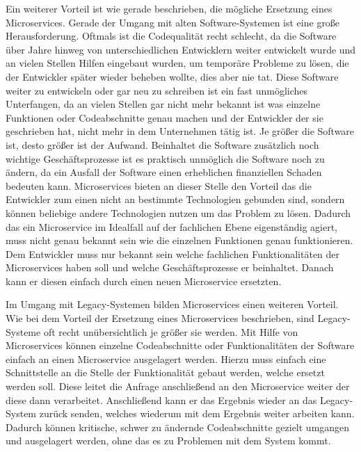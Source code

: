 Ein weiterer Vorteil ist wie gerade beschrieben, die mögliche Ersetzung eines Microservices.
Gerade der Umgang mit alten Software-Systemen ist eine große Herausforderung. Oftmals ist die Codequalität recht schlecht, da die Software über Jahre hinweg von unterschiedlichen Entwicklern weiter entwickelt wurde und an vielen Stellen Hilfen eingebaut wurden, um temporäre Probleme zu lösen, die der Entwickler später wieder beheben wollte, dies aber nie tat. Diese Software weiter zu entwickeln oder gar neu zu schreiben ist ein fast unmögliches Unterfangen, da an vielen Stellen gar nicht mehr bekannt ist was einzelne Funktionen oder Codeabschnitte genau machen und der Entwickler der sie geschrieben hat, nicht mehr in dem Unternehmen tätig ist. Je größer die Software ist, desto größer ist der Aufwand. Beinhaltet die Software zusätzlich noch wichtige Geschäftsprozesse ist es praktisch unmöglich die Software noch zu ändern, da ein Ausfall der Software einen erheblichen finanziellen Schaden bedeuten kann.\newline
Microservices bieten an dieser Stelle den Vorteil das die Entwickler zum einen nicht an bestimmte Technologien gebunden sind, sondern können beliebige andere Technologien nutzen um das Problem zu lösen. Dadurch das ein Microservice im Idealfall auf der fachlichen Ebene eigenständig agiert, muss nicht genau bekannt sein wie die einzelnen Funktionen genau funktionieren. Dem Entwickler muss nur bekannt sein welche fachlichen Funktionalitäten der Microservices haben soll und welche Geschäftsprozesse er beinhaltet. Danach kann er diesen einfach durch einen neuen Microservice ersetzten.\cite{microservices}\newline\newline

Im Umgang mit Legacy-Systemen bilden Microservices einen weiteren Vorteil. Wie bei dem Vorteil der Ersetzung eines Microservices beschrieben, sind Legacy-Systeme oft recht unübersichtlich je größer sie werden. Mit Hilfe von Microservices können einzelne Codeabschnitte oder Funktionalitäten der Software einfach an einen Microservice ausgelagert werden. Hierzu muss einfach eine Schnittstelle an die Stelle der Funktionalität gebaut werden, welche ersetzt werden soll. Diese leitet die Anfrage anschließend an den Microservice weiter der diese dann verarbeitet. Anschließend kann er das Ergebnis wieder an das Legacy-System zurück senden, welches wiederum mit dem Ergebnis weiter arbeiten kann. Dadurch können kritische, schwer zu ändernde Codeabschnitte gezielt umgangen und ausgelagert werden, ohne das es zu Problemen mit dem System kommt.\cite{microservices}\newline\newline

